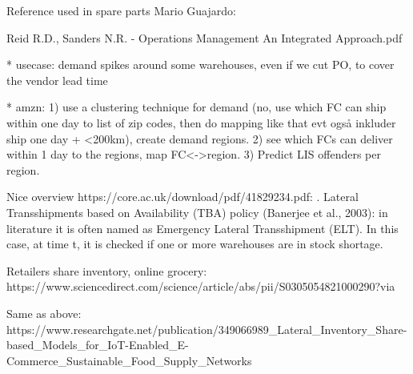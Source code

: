 \documentclass[../../main.tex]{subfiles}
\begin{document}
Reference used in spare parts Mario Guajardo: %


Reid R.D., Sanders N.R. - Operations Management An Integrated Approach.pdf


* usecase: demand spikes around some warehouses, even if we cut PO, to cover the vendor lead time

* amzn: 1) use a clustering technique for demand (no, use which FC can ship within one day to list of zip codes, then do mapping like that evt også inkluder ship one day + <200km), create demand regions. 2) see which FCs can deliver within 1 day to the regions, map FC<->region. 3) Predict LIS offenders per region. 

Nice overview https://core.ac.uk/download/pdf/41829234.pdf:
. Lateral Transshipments based on Availability (TBA) policy (Banerjee et al., 2003): in literature it is often named as Emergency Lateral Transshipment (ELT). In this case, at time t, it is checked if one or more warehouses are in stock shortage. 

Retailers share inventory, online grocery: https://www.sciencedirect.com/science/article/abs/pii/S0305054821000290?via%

Same as above:
https://www.researchgate.net/publication/349066989_Lateral_Inventory_Share-based_Models_for_IoT-Enabled_E-Commerce_Sustainable_Food_Supply_Networks


\end{document}
